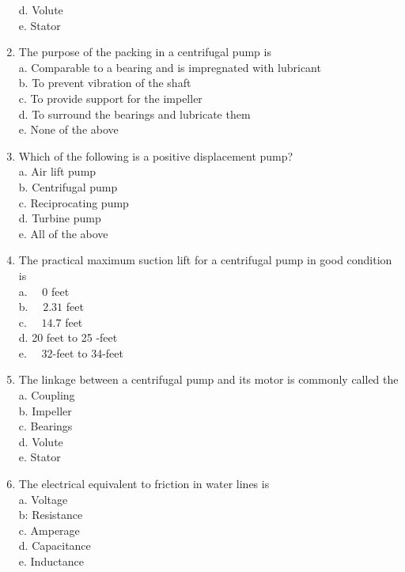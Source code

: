 \begin{enumerate}[1.]
d. Volute\\

e. Stator\\

\item The purpose of the packing in a centrifugal pump is\\

a. Comparable to a bearing and is impregnated with lubricant\\

b. To prevent vibration of the shaft\\

c. To provide support for the impeller\\

d. To surround the bearings and lubricate them\\

e. None of the above\\

  \item Which of the following is a positive displacement pump?\\
a. Air lift pump\\
b. Centrifugal pump\\
c. Reciprocating pump\\
d. Turbine pump\\
e. All of the above

\item The practical maximum suction lift for a centrifugal pump in good condition is \\

a. $\quad 0$ feet\\

b. $\quad 2.31$ feet\\

c. $\quad 14.7$ feet\\

d. 20 feet to 25 -feet\\

e. $\quad 32$-feet to 34-feet

 \item The linkage between a centrifugal pump and its motor is commonly called the\\
a. Coupling\\
b. Impeller\\
c. Bearings\\
d. Volute\\
e. Stator

\item The electrical equivalent to friction in water lines is\\
a. Voltage\\
b: Resistance\\
c. Amperage\\
d. Capacitance\\
e. Inductance


\end{enumerate}
